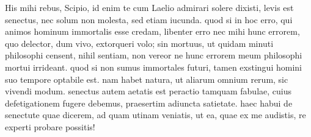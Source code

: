  His mihi rebus, Scipio, id enim te cum Laelio admirari solere dixisti, levis est senectus, nec solum non molesta, sed etiam iucunda. quod si in hoc erro, qui animos hominum immortalis esse credam, libenter erro nec mihi hunc errorem, quo delector, dum vivo, extorqueri volo; sin mortuus, ut quidam minuti philosophi censent, nihil sentiam, non vereor ne hunc errorem meum philosophi mortui irrideant. quod si non sumus immortales futuri, tamen exstingui homini suo tempore optabile est. nam habet natura, ut aliarum omnium rerum, sic vivendi modum. senectus autem aetatis est peractio tamquam fabulae, cuius defetigationem fugere debemus, praesertim adiuncta satietate. haec habui de senectute quae dicerem, ad quam utinam veniatis, ut ea, quae ex me audistis, re experti probare possitis!
